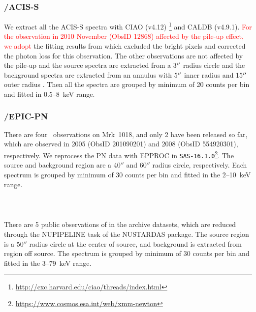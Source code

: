 \subsubsection{\chandra/ACIS-S}
We extract all the ACIS-S spectra with CIAO (v4.12) \footnote{\url{http://cxc.harvard.edu/ciao/threads/index.html}} and {\scriptsize CALDB} (v4.9.1). \textcolor{red}{For the observation in 2010 November (ObsID 12868) affected by the pile-up effect, we adopt} the fitting results from \citet{2016A&A...593L...9H} which excluded the bright pixels and corrected the photon loss for this observation. The other observations are not affected by the pile-up and the source spectra are extracted from a 3$\hbox{$^{\prime\prime}$}$ radius circle and the background spectra are extracted from an annulus with 5$\hbox{$^{\prime\prime}$}$ inner radius and 15$\hbox{$^{\prime\prime}$}$ outer radius \citep[see also][]{2017ApJ...840...11L}. Then all the spectra are grouped by minimum of 20 counts per bin and fitted in 0.5--8~keV range. 


\subsubsection{\xmm/EPIC-PN }
There are four \xmm \, observations on Mrk~1018, and only 2 have been released so far, which are observed in 2005 (ObsID 201090201) and 2008 (ObsID 554920301), respectively. We reprocess the PN data with {\scriptsize EPPROC} in \texttt{SAS-16.1.0}\footnote{\url{https://www.cosmos.esa.int/web/xmm-newton}}. The source and background region are a 40$''$ and 60$''$ radius circle, respectively. Each spectrum is grouped by minimum of 30 counts per bin and fitted in the 2--10~keV range. 



\subsubsection{\nustar\,}
There are 5 public observations of \nustar in the archive datasets, which are reduced through the {\scriptsize NUPIPELINE} task of the {\scriptsize NUSTARDAS} package. The source region is a 50$''$ radius circle at the center of source, and background is extracted from region off source. The spectrum is grouped by minimum of 30 counts per bin and fitted in the 3--79~keV range.

